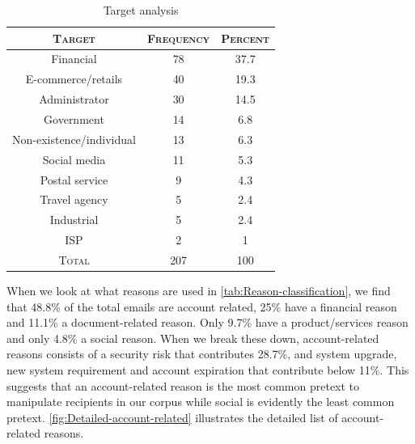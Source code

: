 \begin{table}[h]
\begin{centering}
\begin{tabular}{ccc}
\toprule 
\textsc{\small{}Target} & \textsc{\small{}Frequency} & \textsc{\small{}Percent}\tabularnewline
\midrule
\midrule 
{\small{}Financial} & {\small{}78} & {\small{}37.7}\tabularnewline
\midrule 
{\small{}E-commerce/retails} & {\small{}40} & {\small{}19.3}\tabularnewline
\midrule 
{\small{}Administrator} & {\small{}30} & {\small{}14.5}\tabularnewline
\midrule 
{\small{}Government} & {\small{}14} & {\small{}6.8}\tabularnewline
\midrule 
{\small{}Non-existence/individual} & {\small{}13} & {\small{}6.3}\tabularnewline
\midrule 
{\small{}Social media} & {\small{}11} & {\small{}5.3}\tabularnewline
\midrule 
{\small{}Postal service} & {\small{}9} & {\small{}4.3}\tabularnewline
\midrule 
{\small{}Travel agency} & {\small{}5} & {\small{}2.4}\tabularnewline
\midrule 
{\small{}Industrial} & {\small{}5} & {\small{}2.4}\tabularnewline
\midrule 
{\small{}ISP} & {\small{}2} & {\small{}1}\tabularnewline
\midrule
\midrule 
\textsc{\small{}Total} & \textsc{\small{}207} & \textsc{\small{}100}\tabularnewline
\bottomrule
\end{tabular}
\par\end{centering}

\begin{centering}
\protect\caption{\label{tab:Target-analysis}Target analysis}

\par\end{centering}

%
%
\end{table}


When we look at what reasons are used in \autoref{tab:Reason-classification},
we find that 48.8\% of the total emails are account related, 25\%
have a financial reason and 11.1\% a document-related reason. Only
9.7\% have a product/services reason and only 4.8\% a social reason.
When we break these down, account-related reasons consists of a security
risk that contributes 28.7\%, and system upgrade, new system requirement
and account expiration that contribute below 11\%. This suggests that
an account-related reason is the most common pretext to manipulate
recipients in our corpus while social is evidently the least common
pretext. \autoref{fig:Detailed-account-related} illustrates the detailed
list of account-related reasons.

